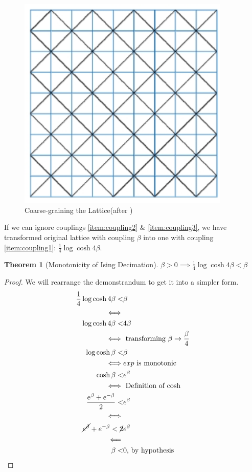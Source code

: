 \documentclass[]{article}
\newtheorem{thm}{Theorem}
\begin{document}
\begin{figure}[H]
	\caption{Coarse-graining the Lattice(after \cite{aoki2014domain})}\label{fig:ising-decimation-aoki}
	\includegraphics[width=0.9\textwidth]{isinng-decimation}
\end{figure}


If we can ignore couplings \ref{item:coupling2} \& \ref{item:coupling3}, we have transformed original lattice with coupling $\beta$ into one with coupling \ref{item:coupling1}: $\frac{1}{4} \log{\cosh{4\beta}}$.

\begin{thm}[Monotonicity of Ising Decimation]
	$\beta > 0 \implies \frac{1}{4} \log{\cosh{4\beta}} < \beta$
\end{thm}

\begin{proof}
	We will rearrange the demonstrandum to get it into a simpler form.
	\begin{align*}
		 \frac{1}{4} \log{\cosh{4\beta}} <& \beta\\
		 \iff&\\
		 \log{\cosh{4\beta}} <& 4\beta\\
		 \iff&\text{ transforming $\beta\rightarrow\frac{\beta}{4}$}\\
		 \log{\cosh{\beta}} <& \beta\\
		 \iff&\text{$exp$ is monotonic}\\
		 \cosh{\beta} <& e^{\beta}\\
		 \iff& \text{ Definition of $\cosh$}\\
		 \frac{e^{\beta}+e^{-\beta}}{2}<&e^{\beta}\\
		 \iff&\\
		 \cancel{e^{\beta}}+e^{-\beta}<\cancel{2}&e^{\beta}\\
		 \impliedby&\\
		 \beta<&0 \text{, by hypothesis}
	\end{align*}

\end{proof}
\end{document}

